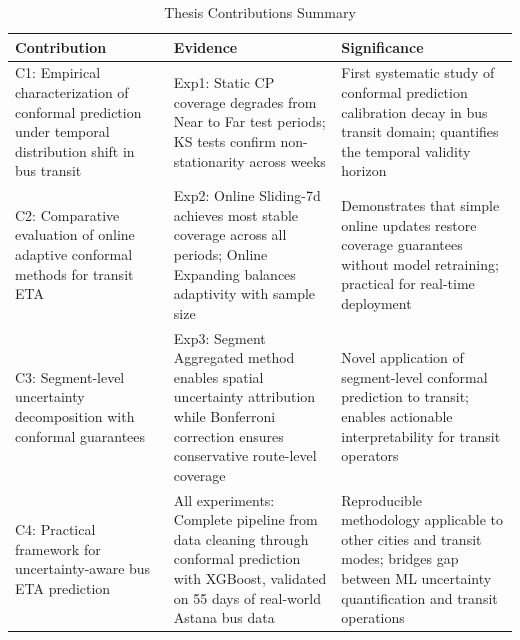 \begin{table}
\caption{Thesis Contributions Summary}
\label{tab:contributions}
\begin{tabular}{p{4.5cm}p{5.5cm}p{5.5cm}}
\toprule
Contribution & Evidence & Significance \\
\midrule
C1: Empirical characterization of conformal prediction under temporal distribution shift in bus transit & Exp1: Static CP coverage degrades from Near to Far test periods; KS tests confirm non-stationarity across weeks & First systematic study of conformal prediction calibration decay in bus transit domain; quantifies the temporal validity horizon \\
C2: Comparative evaluation of online adaptive conformal methods for transit ETA & Exp2: Online Sliding-7d achieves most stable coverage across all periods; Online Expanding balances adaptivity with sample size & Demonstrates that simple online updates restore coverage guarantees without model retraining; practical for real-time deployment \\
C3: Segment-level uncertainty decomposition with conformal guarantees & Exp3: Segment Aggregated method enables spatial uncertainty attribution while Bonferroni correction ensures conservative route-level coverage & Novel application of segment-level conformal prediction to transit; enables actionable interpretability for transit operators \\
C4: Practical framework for uncertainty-aware bus ETA prediction & All experiments: Complete pipeline from data cleaning through conformal prediction with XGBoost, validated on 55 days of real-world Astana bus data & Reproducible methodology applicable to other cities and transit modes; bridges gap between ML uncertainty quantification and transit operations \\
\bottomrule
\end{tabular}
\end{table}
